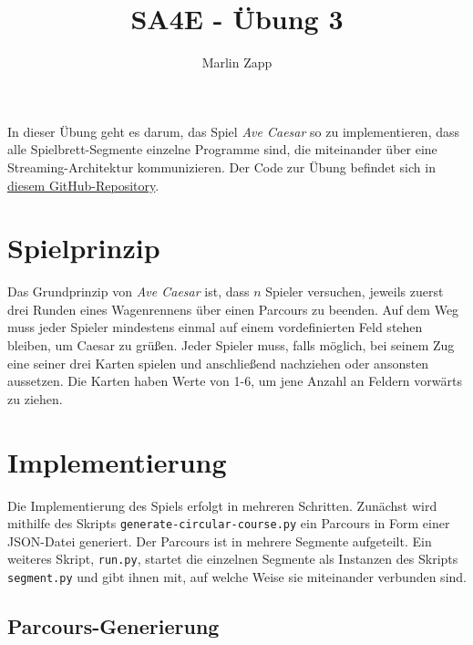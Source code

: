 \documentclass[]{article}
\title{SA4E - Übung 3}
\author{Marlin Zapp}
\begin{document}
\maketitle

In dieser Übung geht es darum, das Spiel \emph{Ave Caesar} so zu implementieren, dass alle Spielbrett-Segmente einzelne Programme sind, die miteinander über eine Streaming-Architektur kommunizieren. Der Code zur Übung befindet sich in \href{https://github.com/MarlinZapp/ave-caesar}{diesem GitHub-Repository}.

\tableofcontents

\section{Spielprinzip}
\label{sec:spielprinzip}

Das Grundprinzip von \emph{Ave Caesar} ist, dass $n$ Spieler versuchen, jeweils zuerst drei Runden eines Wagenrennens über einen Parcours zu beenden. Auf dem Weg muss jeder Spieler mindestens einmal auf einem vordefinierten Feld stehen bleiben, um Caesar zu grüßen. Jeder Spieler muss, falls möglich, bei seinem Zug eine seiner drei Karten spielen und anschließend nachziehen oder ansonsten aussetzen. Die Karten haben Werte von 1-6, um jene Anzahl an Feldern vorwärts zu ziehen.

\section{Implementierung}
\label{sec:implementierung}

Die Implementierung des Spiels erfolgt in mehreren Schritten. Zunächst wird mithilfe des Skripts \texttt{generate-circular-course.py} ein Parcours in Form einer JSON-Datei generiert. Der Parcours ist in mehrere Segmente aufgeteilt. Ein weiteres Skript, \texttt{run.py}, startet die einzelnen Segmente als Instanzen des Skripts \texttt{segment.py} und gibt ihnen mit, auf welche Weise sie miteinander verbunden sind.

\subsection{Parcours-Generierung}
\label{subsec:parcours-generierung}
\end{document}
